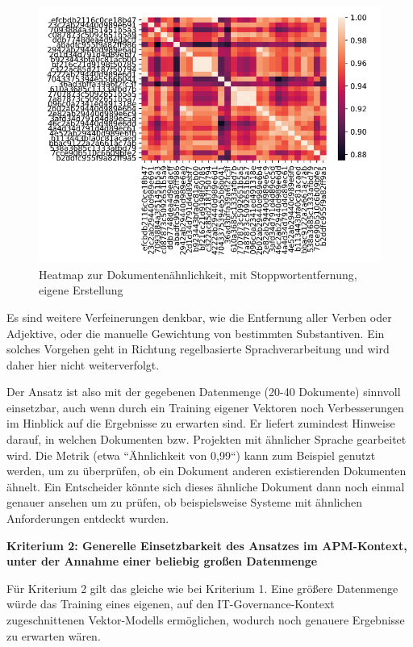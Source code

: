 \begin{figure}[]
\centering
\includegraphics[scale=0.95]{content/pics/Picture_13.png}
\caption{Heatmap zur Dokumentenähnlichkeit, mit Stoppwortentfernung, eigene Erstellung}
\label{Abbildung:heatmap2}
\end{figure}

Es sind weitere Verfeinerungen denkbar, wie die Entfernung aller Verben oder Adjektive, oder die manuelle Gewichtung von bestimmten Substantiven. Ein solches Vorgehen geht in Richtung regelbasierte Sprachverarbeitung und wird daher hier nicht weiterverfolgt. 

Der Ansatz ist also mit der gegebenen Datenmenge (20-40 Dokumente) sinnvoll einsetzbar, auch wenn durch ein Training eigener Vektoren noch Verbesserungen im Hinblick auf die Ergebnisse zu erwarten sind. Er liefert zumindest Hinweise darauf, in welchen Dokumenten bzw. Projekten mit ähnlicher Sprache gearbeitet wird.
Die Metrik (etwa ``Ähnlichkeit von 0,99``) kann zum Beispiel genutzt werden, um zu überprüfen, ob ein Dokument anderen existierenden Dokumenten ähnelt. Ein Entscheider könnte sich dieses ähnliche Dokument dann noch einmal genauer ansehen um zu prüfen, ob beispielsweise Systeme mit ähnlichen Anforderungen entdeckt wurden.

{\bf Kriterium 2: Generelle Einsetzbarkeit des Ansatzes im APM-Kontext, unter der Annahme einer beliebig großen Datenmenge}

Für Kriterium 2 gilt das gleiche wie bei Kriterium 1. Eine größere Datenmenge würde das Training eines eigenen, auf den IT-Governance-Kontext zugeschnittenen Vektor-Modells ermöglichen, wodurch noch genauere Ergebnisse zu erwarten wären.

